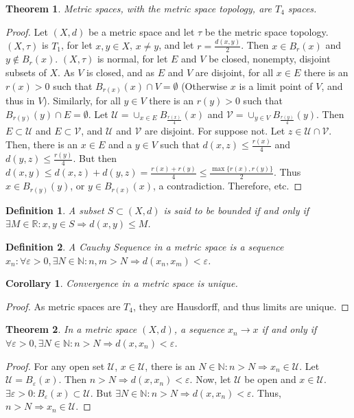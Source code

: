 \documentclass[oneside]{book}
\theoremstyle{mystyle}
\newtheorem{theorem}{Theorem}[section]
\newtheorem{definition}{Definition}[section]
\newtheorem{corollary}{Corollary}[section]
\begin{document}
\begin{theorem}
Metric spaces, with the metric space topology, are $T_4$ spaces.
\end{theorem}
\begin{proof}
Let $(X,d)$ be a metric space and let $\tau$ be the metric space topology. $(X,\tau)$ is $T_1$, for let $x,y\in X$, $x\ne y$, and let $r= \frac{d(x,y)}{2}$. Then $x\in B_{r}(x)$ and $y\notin B_{r}(x)$. $(X,\tau)$ is normal, for let $E$ and $V$ be closed, nonempty, disjoint subsets of $X$. As $V$ is closed, and as $E$ and $V$ are disjoint, for all $x\in E$ there is an $r(x)>0$ such that $B_{r(x)}(x)\cap V = \emptyset$ (Otherwise $x$ is a limit point of $V$, and thus in $V$). Similarly, for all $y\in V$ there is an $r(y)>0$ such that $B_{r(y)}(y)\cap E = \emptyset$. Let $\mathcal{U} = \cup_{x\in E}B_{\frac{r(x)}{4}}(x)$ and $\mathcal{V} = \cup_{y\in V}B_{\frac{r(y)}{4}}(y)$. Then $E\subset \mathcal{U}$ and $E\subset \mathcal{V}$, and $\mathcal{U}$ and $\mathcal{V}$ are disjoint. For suppose not. Let $z\in \mathcal{U}\cap \mathcal{V}$. Then, there is an $x\in E$ and a $y\in V$ such that $d(x,z)\leq \frac{r(x)}{4}$ and $d(y,z)\leq \frac{r(y)}{4}$. But then $d(x,y) \leq d(x,z)+d(y,z) = \frac{r(x)+r(y)}{4} \leq \frac{\max\{r(x),r(y)\}}{2}$. Thus $x\in B_{r(y)}(y)$, or $y\in B_{r(x)}(x)$, a contradiction. Therefore, etc.
\end{proof}

\begin{definition}
A subset $S\subset (X,d)$ is said to be bounded if and only if $\exists M\in \mathbb{R}:x,y\in S\Rightarrow d(x,y)\leq M$.
\end{definition}

\begin{definition}
A Cauchy Sequence in a metric space is a sequence $x_n:\forall \varepsilon>0,\exists N\in \mathbb{N}:n,m>N\Rightarrow d(x_n,x_m)<\varepsilon$.
\end{definition}

\begin{corollary}
Convergence in a metric space is unique.
\end{corollary}
\begin{proof}
As metric spaces are $T_4$, they are Hausdorff, and thus limits are unique.
\end{proof}

\begin{theorem}
In a metric space $(X,d)$, a sequence $x_n\rightarrow x$ if and only if $\forall\varepsilon>0,\exists N\in \mathbb{N}:n>N\Rightarrow d(x,x_n)<\varepsilon$.
\end{theorem}
\begin{proof}
For any open set $\mathcal{U}$, $x\in \mathcal{U}$, there is an $N\in \mathbb{N}:n>N\Rightarrow x_n \in \mathcal{U}$. Let $\mathcal{U}=B_{\varepsilon}(x)$. Then $n>N\Rightarrow d(x,x_n)<\varepsilon$. Now, let $\mathcal{U}$ be open and $x\in \mathcal{U}$. $\exists\varepsilon>0:B_{\varepsilon}(x)\subset \mathcal{U}$. But $\exists N\in \mathbb{N}:n>N\Rightarrow d(x,x_n)<\varepsilon$. Thus, $n>N\Rightarrow x_n\in \mathcal{U}$.
\end{proof}
\end{document}
